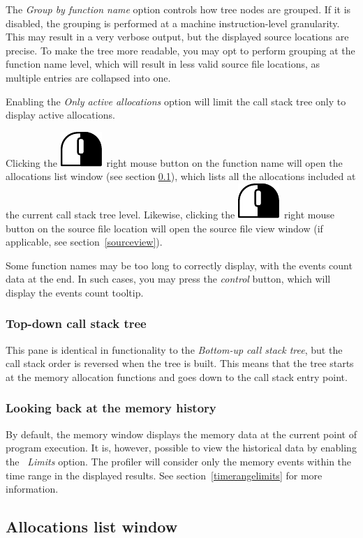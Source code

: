 \documentclass[hidelinks,titlepage,a4paper]{article}
\newcommand{\RMB}{\includegraphics[height=.8\baselineskip]{icons/rmb}}
\begin{document}
The \emph{Group by function name} option controls how tree nodes are grouped. If it is disabled, the grouping is performed at a machine instruction-level granularity. This may result in a very verbose output, but the displayed source locations are precise. To make the tree more readable, you may opt to perform grouping at the function name level, which will result in less valid source file locations, as multiple entries are collapsed into one.

Enabling the \emph{Only active allocations} option will limit the call stack tree only to display active allocations.

Clicking the \RMB{}~right mouse button on the function name will open the allocations list window (see section \ref{alloclist}), which lists all the allocations included at the current call stack tree level. Likewise, clicking the \RMB{}~right mouse button on the source file location will open the source file view window (if applicable, see section~\ref{sourceview}).

Some function names may be too long to correctly display, with the events count data at the end. In such cases, you may press the \emph{control} button, which will display the events count tooltip.

\subsubsection{Top-down call stack tree}

This pane is identical in functionality to the \emph{Bottom-up call stack tree}, but the call stack order is reversed when the tree is built. This means that the tree starts at the memory allocation functions and goes down to the call stack entry point.

\subsubsection{Looking back at the memory history}

By default, the memory window displays the memory data at the current point of program execution. It is, however, possible to view the historical data by enabling the \emph{\faRuler{}~Limits} option. The profiler will consider only the memory events within the time range in the displayed results. See section~\ref{timerangelimits} for more information.

\subsection{Allocations list window}
\label{alloclist}
\end{document}
